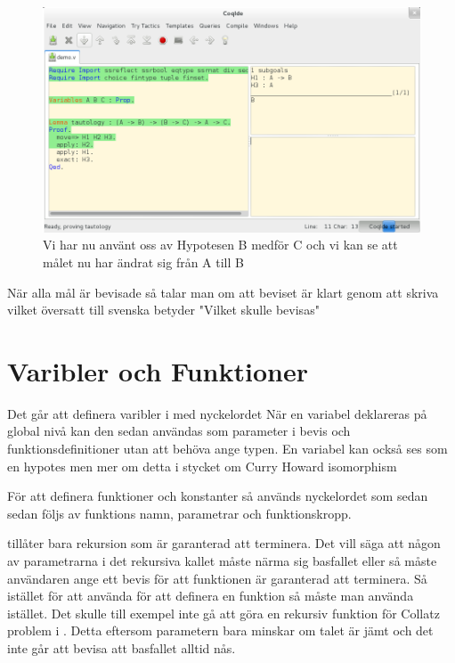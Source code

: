 \begin{figure}[H]
  \centering
  \includegraphics[width=150mm]{images/Proof_part3}
  \caption[Bevis i \coq IDE]
   {Vi har nu använt oss av Hypotesen B medför C och vi
    kan se att målet nu har ändrat sig från A till B}
\end{figure}

När alla mål är bevisade så talar man om att beviset är klart genom att
skriva  vilket översatt till svenska betyder
"Vilket skulle bevisas"

\section{Varibler och Funktioner}

Det går att definera varibler i \coq med nyckelordet 
När en variabel deklareras på global nivå kan den sedan användas som
parameter i bevis och funktionsdefinitioner utan att behöva ange typen.
En variabel kan också ses som en hypotes men mer om detta i stycket om
Curry Howard isomorphism

För att definera funktioner och konstanter så används nyckelordet
 som sedan sedan följs av funktions namn,
parametrar och funktionskropp.

\coq tillåter bara rekursion som är garanterad att terminera. Det vill
säga att någon av parametrarna i det rekursiva kallet måste närma sig
basfallet eller så måste användaren ange ett bevis för att funktionen är
garanterad att terminera. Så istället för att använda 
för att definera en funktion så måste man använda  istället.
Det skulle till exempel inte gå att göra en rekursiv
funktion för Collatz problem i \coq. Detta eftersom parametern bara minskar
om talet är jämt och det inte går att bevisa att basfallet alltid nås.

